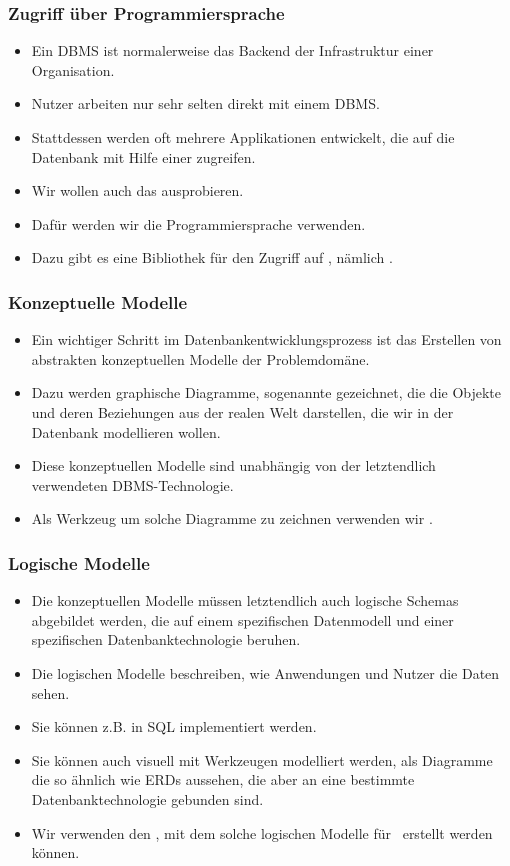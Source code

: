 \documentclass[aspectratio=169,mathserif,notheorems]{beamer}%
\begin{document}
%
\begin{frame}[b]%
\frametitle{Zugriff über Programmiersprache}%
\begin{itemize}%
\item Ein DBMS ist normalerweise das Backend der Infrastruktur einer Organisation.%
\item<2-> Nutzer arbeiten nur sehr selten direkt mit einem DBMS.%
\item<3-> Stattdessen werden oft mehrere Applikationen entwickelt, die auf die Datenbank mit Hilfe einer  zugreifen.%
\item<4-> Wir wollen auch das ausprobieren.%
\item<5-> Dafür werden wir die Programmiersprache \python\cite{K2018EIPFEUU,A2002PC,H2023ABGTP3P,LH2015DSAAWP,programmingWithPython} verwenden.%
\item<6-> Dazu gibt es eine Bibliothek für den Zugriff auf \postgresql, nämlich \psycopg\cite{VDGE2010P}.%
\end{itemize}%
%
\end{frame}%
%
\begin{frame}%
\frametitle{Konzeptuelle Modelle}%
\begin{itemize}%
\item Ein wichtiger Schritt im Datenbankentwicklungsprozess ist das Erstellen von abstrakten konzeptuellen Modelle der Problemdomäne.%
\item<2-> Dazu werden graphische Diagramme, sogenannte  gezeichnet, die die Objekte und deren Beziehungen aus der realen Welt darstellen, die wir in der Datenbank modellieren wollen.%
\item<3-> Diese konzeptuellen Modelle sind unabhängig von der letztendlich verwendeten DBMS-Technologie.%
\item<4-> Als Werkzeug um solche Diagramme zu zeichnen verwenden wir \yEd\cite{SG2015MDAWY,Y2011YGEM}.%
\end{itemize}%
\end{frame}%
%
\begin{frame}%
\frametitle{Logische Modelle}%
\begin{itemize}%
\item Die konzeptuellen Modelle müssen letztendlich auch logische Schemas abgebildet werden, die auf einem spezifischen Datenmodell und einer spezifischen Datenbanktechnologie beruhen.%
\item<2-> Die logischen Modelle beschreiben, wie Anwendungen und Nutzer die Daten sehen.%
\item<3-> Sie können z.B. in SQL implementiert werden.%
\item<4-> Sie können auch visuell mit Werkzeugen modelliert werden, als Diagramme die so ähnlich wie ERDs aussehen, die aber an eine bestimmte Datenbanktechnologie gebunden sind.%
\item<5-> Wir verwenden den \pgmodeler\cite{AES2006PPDM}, mit dem solche logischen Modelle für \postgresql\ erstellt werden können.%
\end{itemize}%
\end{frame}%
\end{document}
